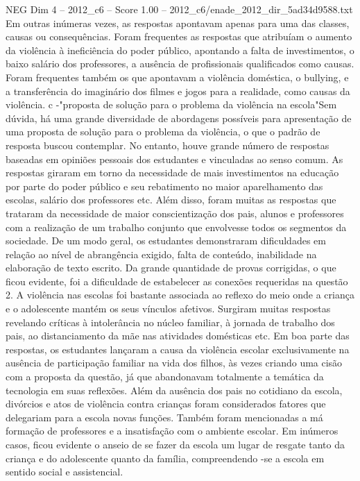 \begin{textsample}{NEG Dim 4 – 2012\_c6 – Score 1.00 – 2012\_c6/enade\_2012\_dir\_5ad34d9588.txt}
Em outras inúmeras vezes, as respostas apontavam apenas para uma das classes, causas ou consequências.
Foram frequentes as respostas que atribuíam o aumento da violência à ineficiência do poder público, apontando a falta de investimentos, o baixo salário dos professores, a ausência de profissionais qualificados como causas.
Foram frequentes também os que apontavam a violência doméstica, o bullying, e a transferência do imaginário dos filmes e jogos para a realidade, como causas da violência. c -"proposta de solução para o problema da violência na escola"Sem dúvida, há uma grande diversidade de abordagens possíveis para apresentação de uma proposta de solução para o problema da violência, o que o padrão de resposta buscou contemplar.
No entanto, houve grande número de respostas baseadas em opiniões pessoais dos estudantes e vinculadas ao senso comum.
As respostas giraram em torno da necessidade de mais investimentos na educação por parte do poder público e seu rebatimento no maior aparelhamento das escolas, salário dos professores etc.
Além disso, foram muitas as respostas que trataram da necessidade de maior conscientização dos pais, alunos e professores com a realização de um trabalho conjunto que envolvesse todos os segmentos da sociedade.
De um modo geral, os estudantes demonstraram dificuldades em relação ao nível de abrangência exigido, falta de conteúdo, inabilidade na elaboração de texto escrito.
Da grande quantidade de provas corrigidas, o que ficou evidente, foi a dificuldade de estabelecer as conexões requeridas na questão 2.
A violência nas escolas foi bastante associada ao reflexo do meio onde a criança e o adolescente mantém os seus vínculos afetivos.
Surgiram muitas respostas revelando críticas à intolerância no núcleo familiar, à jornada de trabalho dos pais, ao distanciamento da mãe nas atividades domésticas etc.
Em boa parte das respostas, os estudantes lançaram a causa da violência escolar exclusivamente na ausência de participação familiar na vida dos filhos, às vezes criando uma cisão com a proposta da questão, já que abandonavam totalmente a temática da tecnologia em suas reflexões.
Além da ausência dos pais no cotidiano da escola, divórcios e atos de violência contra crianças foram considerados fatores que delegariam para a escola novas funções.
Também foram mencionadas a má formação de professores e a insatisfação com o ambiente escolar.
Em inúmeros casos, ficou evidente o anseio de se fazer da escola um lugar de resgate tanto da criança e do adolescente quanto da família, compreendendo -se a escola em sentido social e assistencial.

\end{textsample}
